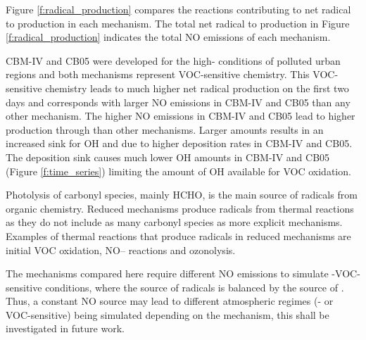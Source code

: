 Figure \ref{f:radical_production} compares the reactions contributing to net radical to  production in each mechanism.
The total net radical to  production in Figure \ref{f:radical_production} indicates the total NO emissions of each mechanism.

CBM-IV and CB05 were developed for the high- conditions of polluted urban regions \citep{Gery:1989, Yarwood:2005} and both mechanisms represent VOC-sensitive chemistry.
This VOC-sensitive chemistry leads to much higher net radical production on the first two days and corresponds with larger NO emissions in CBM-IV and CB05 than any other mechanism.
The higher NO emissions in CBM-IV and CB05 lead to higher  production through  than other mechanisms.
Larger  amounts results in an increased sink for OH and  due to higher  deposition rates in CBM-IV and CB05.
The  deposition sink causes much lower OH amounts in CBM-IV and CB05 (Figure \ref{f:time_series}) limiting the amount of OH available for VOC oxidation.

Photolysis of carbonyl species, mainly HCHO, is the main source of radicals from organic chemistry.
Reduced mechanisms produce radicals from thermal reactions as they do not include as many carbonyl species as more explicit mechanisms. 
Examples of thermal reactions that produce radicals in reduced mechanisms are initial VOC oxidation, NO-- reactions and ozonolysis.

The mechanisms compared here require different NO emissions to simulate -VOC-sensitive conditions, where the source of radicals is balanced by the source of .
Thus, a constant NO source may lead to different atmospheric regimes (- or VOC-sensitive) being simulated depending on the mechanism, this shall be investigated in future work.
